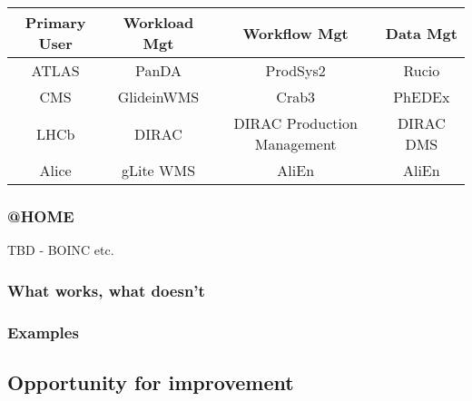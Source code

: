 \begin{center}
  \begin{tabular}{ c | c | c | c }
    \hline
    \textbf{Primary User} & \textbf{Workload Mgt} & \textbf{Workflow Mgt} & \textbf{Data Mgt}\\ \hline \hline
    ATLAS & PanDA & ProdSys2 & Rucio\\ \hline
    CMS  & GlideinWMS & Crab3 & PhEDEx\\ \hline
    LHCb  & DIRAC & DIRAC Production Management & DIRAC DMS\\ \hline
    Alice  & gLite WMS & AliEn & AliEn\\ 
    \hline
  \end{tabular}
\end{center}

\subsubsection{@HOME}
TBD - BOINC etc.

\subsubsection{What works, what doesn't}
\subsubsection{Examples}
\subsection{Opportunity for improvement}


